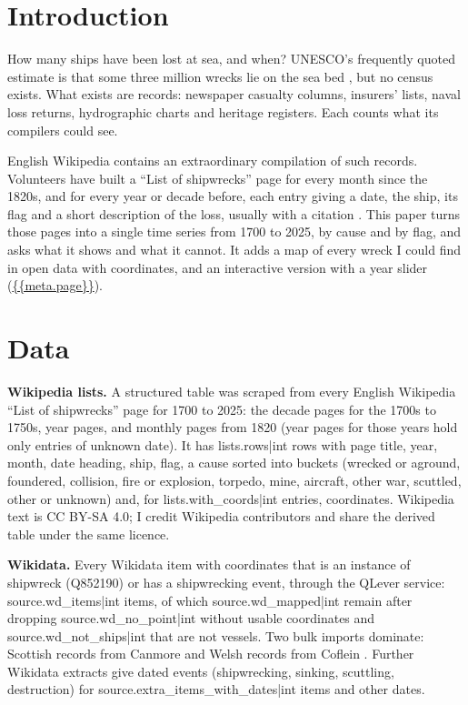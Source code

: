 \documentclass[11pt,a4paper]{article}
\begin{document}
\section{Introduction}
How many ships have been lost at sea, and when? UNESCO's frequently quoted estimate is that some three million wrecks lie on the sea bed \citep{unesco}, but no census exists. What exists are records: newspaper casualty columns, insurers' lists, naval loss returns, hydrographic charts and heritage registers. Each counts what its compilers could see.

English Wikipedia contains an extraordinary compilation of such records. Volunteers have built a ``List of shipwrecks'' page for every month since the 1820s, and for every year or decade before, each entry giving a date, the ship, its flag and a short description of the loss, usually with a citation \citep{wikilists}. This paper turns those pages into a single time series from 1700 to 2025, by cause and by flag, and asks what it shows and what it cannot. It adds a map of every wreck I could find in open data with coordinates, and an interactive version with a year slider (\url{{{meta.page}}}).

\section{Data}
\textbf{Wikipedia lists.} A structured table was scraped from every English Wikipedia ``List of shipwrecks'' page for 1700 to 2025: the decade pages for the 1700s to 1750s, year pages, and monthly pages from 1820 (year pages for those years hold only entries of unknown date). It has {{lists.rows|int}} rows with page title, year, month, date heading, ship, flag, a cause sorted into buckets (wrecked or aground, foundered, collision, fire or explosion, torpedo, mine, aircraft, other war, scuttled, other or unknown) and, for {{lists.with_coords|int}} entries, coordinates. Wikipedia text is CC BY-SA 4.0; I credit Wikipedia contributors and share the derived table under the same licence.

\textbf{Wikidata.} Every Wikidata \citep{wikidata} item with coordinates that is an instance of shipwreck (Q852190) or has a shipwrecking event, through the QLever service: {{source.wd_items|int}} items, of which {{source.wd_mapped|int}} remain after dropping {{source.wd_no_point|int}} without usable coordinates and {{source.wd_not_ships|int}} that are not vessels. Two bulk imports dominate: Scottish records from Canmore \citep{canmore} and Welsh records from Coflein \citep{coflein}. Further Wikidata extracts give dated events (shipwrecking, sinking, scuttling, destruction) for {{source.extra_items_with_dates|int}} items and other dates.
\end{document}
